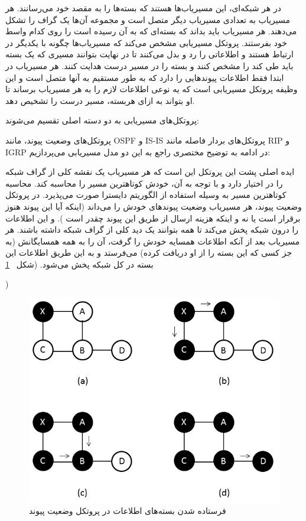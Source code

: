 
در هر شبکه‌ای، این مسیریاب‌ها هستند که بسته‌ها را به مقصد خود می‌رسانند. هر مسیریاب به تعدادی مسیریاب دیگر متصل است و مجموعه آن‌ها یک گراف را تشکل می‌دهند. هر مسیریاب باید بداند که بسته‌ای که به آن رسیده است را روی کدام واسط خود بفرستند. 
پروتکل مسیریابی مشخص می‌کند که مسیریاب‌ها چگونه با یکدیگر در ارتباط‌‌ هستند و اطلاعاتی را رد و بدل می‌کنند تا در نهایت بتوانند مسیری که یک بسته باید طی کند را مشخص کنند و بسته را در مسیر درست هدایت کنند. هر مسیریاب در ابتدا فقط اطلاعات پیوندهایی را دارد که به طور مستقیم به آنها متصل است و این وظیفه پروتکل مسیریابی است که یه نوعی اطلاعات لازم را به هر مسیریاب برساند تا او بتواند به ازای هربسته، مسیر درست را تشخیص دهد. 

پروتکل‌های مسیریابی به دو دسته اصلی تقسیم می‌شوند:‌

 پروتکل‌های وضعیت پیوند، مانند OSPF
و
 IS-IS
 پروتکل‌های بردار فاصله مانند RIP
و IGRP
 در ادامه به توضیح مختصری راجع به این دو مدل مسیریابی می‌پردازیم:
 
 ایده اصلی پشت این پروتکل این است که هر مسیریاب یک نقشه کلی از گراف شبکه را در اختیار دارد و با توجه به آن، خودش کوتاهترین مسیر را محاسبه کند. محاسبه کوتاهترین مسیر به وسیله استفاده از الگوریتم دایسترا صورت می‌پذیرد. در پروتکل وضعیت پیوند، هر مسیریاب وضعیت پیوند‌های خودش را می‌داند (‌اینکه آیا این پیوند هنوز برقرار است یا نه و اینکه هزینه ارسال از طریق این پیوند چقدر است ). و این اطلاعات را درون شبکه پخش می‌کند تا همه بتوانند یک دید کلی از گراف شبکه داشته باشند. هر مسیریاب بعد از آنکه اطلاعات همسایه خودش را گرفت، آن را به همه همسایگانش (‌به جز کسی که این بسته را از او دریافت کرده)‌ می‌فرستد و به این طریق اطلاعات این بسته در کل شبکه پخش می‌شود. (‌شکل 
~\ref{fig:linkstate}

 )
 \begin{figure}[H]
\centering
\includegraphics[scale=0.6]{./resources/figures/linkstate.png}
\caption{فرستاده شدن بسته‌‌های اطلاعات در پروتکل وضعیت پیوند}
\label{fig:linkstate}
\end{figure}
 
